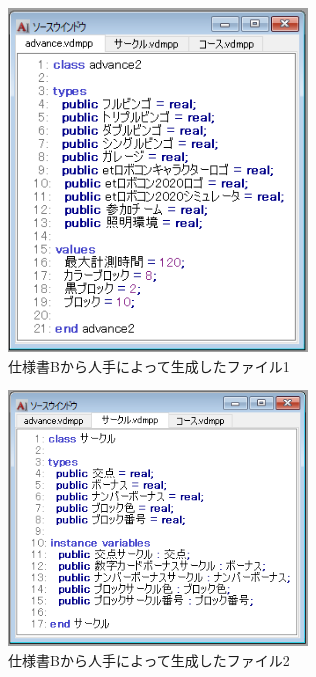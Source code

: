 \begin{figure}[tp]
    \begin{center}
    \includegraphics[width=300]{image/speB_vdm1.PNG}
    \caption{仕様書Bから人手によって生成したファイル1}
    \label{fig:speB_vdm1}
    \end{center}
\end{figure}

\begin{figure}[tp]
    \begin{center}
    \includegraphics[width=300]{image/speB_vdm2.PNG}
    \caption{仕様書Bから人手によって生成したファイル2}
    \label{fig:speB_vdm2}
    \end{center}
\end{figure}

